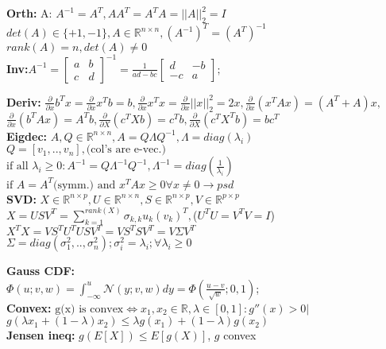 \textbf{Orth:} A: $A^{-1}=A^T,AA^T=A^TA=||A||_2^2=I$\\
$det(A)\in\{+1,-1\}, A\in\mathbb{R}^{n\times n}, (A^{-1})^T=(A^T)^{-1}$\\
$rank(A)=n, det(A)\neq0$\\
\textbf{Inv:}$A^{-1}=
\begin{bmatrix}
a&b \\ 
c&d
\end{bmatrix}^{-1}=\frac{1}{ad-bc}
\begin{bmatrix}
d&-b \\ 
-c&a
\end{bmatrix};
$

\textbf{Deriv:}
$\frac{\partial}{\partial x}b^Tx=\frac{\partial}{\partial x}x^Tb=b,\!
\frac{\partial}{\partial x}x^Tx=\frac{\partial}{\partial x}||x||_2^2=2x,\!
\frac{\partial}{\partial x}(x^TAx)=(A^T+A)x,$
$\frac{\partial}{\partial x}(b^TAx)=A^Tb, \frac{\partial}{\partial X}(c^TXb)=c^Tb,
\frac{\partial}{\partial X}(c^TX^Tb)=bc^T$\\
\textbf{Eigdec:}
$A,Q \in \mathbb{R}^{n\times n}, A=Q\Lambda Q^{-1},\! \Lambda = diag(\lambda_i)$\\
$Q=[v_1,..,v_n], \text{(col's are e-vec.)}$\\
$\text{if all $\lambda_i\geq0:$} A^{-1}=Q\Lambda^{-1}Q^{-1},\Lambda^{-1}=diag(\frac{1}{\lambda_i})$\\
$\text{if }A=A^T\text{(symm.) and }x^TAx\geq0 \forall x \neq 0 \rightarrow psd$\\
\textbf{SVD:}
$X\in \mathbb{R}^{n\times p}, U\in \mathbb{R}^{n\times n}, S\in \mathbb{R}^{n\times p},
V\in \mathbb{R}^{p\times p}$\\
$X=USV^T=\sum_{k=1}^{rank(X)}\sigma_{k,k}u_k (v_k)^T,\!${\tiny{($U^TU=V^TV=I$)}}\\
$X^TX=VS^TU^TUSV^T=VS^TSV^T=V\Sigma V^T$\\
$\Sigma = diag(\sigma_1^2,..,\sigma_n^2);\sigma_i^2=\lambda_i; \forall \lambda_i \geq 0$


\textbf{Gauss CDF:}\\
$\Phi(u;v,w) = \int_{-\infty}^{u} \mathcal{N}(y;v,w)dy=\Phi(\frac{u-v}{\sqrt{w}};0,1)$;\\ %
\textbf{Convex:}
$\text{g(x) is convex} \Leftrightarrow x_1,x_2 \in \mathbb{R}, \lambda \in [0,1]: g''(x) > 0|$
$g(\lambda x_1 + (1-\lambda) x_2) \leq \lambda g(x_1) + (1-\lambda) g(x_2)$\\
\textbf{Jensen ineq: }$g(E[X]) \leq E[g(X)]$, $g$ convex

